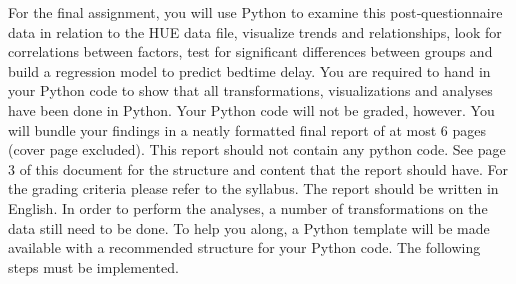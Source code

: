 \documentclass[a4paper]{report}
\theoremstyle{definition}
\begin{document}
For the final assignment, you will use Python to examine this
post‐questionnaire data in relation to the HUE data file, visualize
trends and relationships, look for correlations between factors, test
for significant differences between groups and build a regression model
to predict bedtime delay. You are required to hand in your Python code
to show that all transformations, visualizations and analyses have been
done in Python. Your Python code will not be graded, however. You will
bundle your findings in a neatly formatted final report of at most 6 pages
(cover page excluded). This report should not contain any python code. See
page 3 of this document for the structure and content that the report
should have. For the grading criteria please refer to the syllabus. The
report should be written in English.  In order to perform the analyses,
a number of transformations on the data still need to be done. To help
you along, a Python template will be made available with a recommended
structure for your Python code. The following steps must be implemented.
\end{document}

